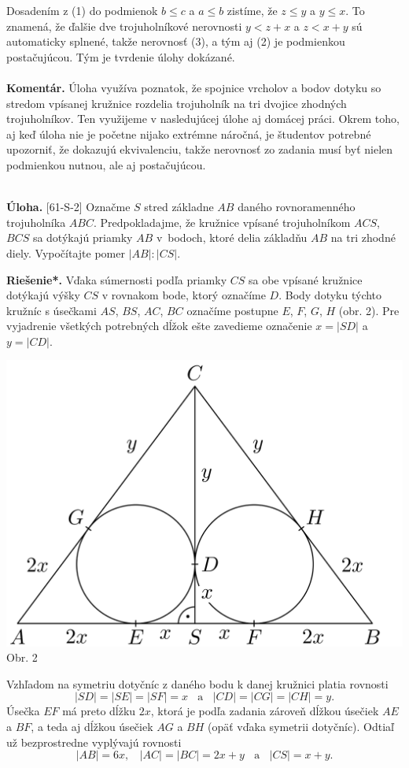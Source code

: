 \documentclass[11pt,a4paper,oneside,final]{book}
\newcommand{\kom}{\textbf{Komentár.} }
\newcommand{\ul}{\textbf{Úloha.} }
\newcommand{\rieh}{\textbf{Riešenie*.} }
\begin{document}
Dosadením z (1) do podmienok $b \leq c$ a $a \leq b$ zistíme, že $z \leq y$ a $y \leq x$. To znamená, že ďalšie dve trojuholníkové nerovnosti $y < z + x$ a $z < x + y$ sú automaticky splnené, takže nerovnosť (3), a tým aj (2) je podmienkou postačujúcou. Tým je tvrdenie úlohy dokázané.\\
\\
\kom Úloha využíva poznatok, že spojnice vrcholov a bodov dotyku so stredom vpísanej kružnice rozdelia trojuholník na tri dvojice zhodných trojuholníkov. Ten využijeme v nasledujúcej úlohe aj domácej práci. Okrem toho, aj keď úloha nie je početne nijako extrémne náročná, je študentov potrebné upozorniť, že dokazujú ekvivalenciu, takže nerovnosť zo zadania musí byť nielen podmienkou nutnou, ale aj postačujúcou.\\
\\
\begin{tcolorbox}[breakable,notitle,boxrule=0pt,colback=light-gray,colframe=light-gray]\ul [61-S-2] Označme $S$ stred základne $AB$ daného rovnoramenného trojuholníka $ABC$. Predpokladajme, že kružnice vpísané trojuholníkom $ACS$, $BCS$ sa dotýkajú priamky $AB$ v~bodoch, ktoré delia základňu $AB$ na tri zhodné diely. Vypočítajte pomer $|AB| : |CS|$.

\end{tcolorbox}

\rieh Vďaka súmernosti podľa priamky $CS$ sa obe vpísané kružnice dotýkajú výšky $CS$ v rovnakom bode, ktorý označíme $D$. Body dotyku týchto kružníc s úsečkami $AS$, $BS$, $AC$, $BC$ označíme postupne $E$, $F$, $G$, $H$ (obr. 2). Pre vyjadrenie všetkých potrebných dĺžok ešte zavedieme označenie $x = |SD|$ a $y = |CD|$.
\begin{center}
\includegraphics{61S2}\\

Obr. 2
\end{center}
Vzhľadom na symetriu dotyčníc z daného bodu k danej kružnici platia rovnosti
$$|SD| = |SE| = |SF| = x \ \ \ \ \text{a} \ \ \ \ |CD| = |CG| = |CH| = y.$$
Úsečka $EF$ má preto dĺžku $2x$, ktorá je podľa zadania zároveň dĺžkou úsečiek $AE$ a $BF$, a teda aj dĺžkou úsečiek $AG$ a $BH$ (opäť vďaka symetrii dotyčníc). Odtiaľ už bezprostredne vyplývajú rovnosti
$$|AB| = 6x, \ \ \ \ |AC| = |BC| = 2x + y \ \ \ \ \text{a} \ \ \ \  |CS| = x + y.$$
\end{document}
